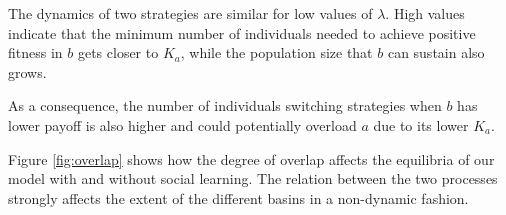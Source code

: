\documentclass[3p,authoryear,twocolumn]{elsarticle} %
\begin{document}



The dynamics of two strategies are similar for low values of $\lambda$. High values indicate that the minimum number of individuals needed to achieve positive fitness in $b$ gets closer to $K_a$, while the population size that $b$ can sustain also grows. 

As a consequence, the number of individuals switching strategies when $b$ has lower payoff is also higher and could potentially overload $a$ due to its lower $K_a$.



Figure \ref{fig:overlap} shows how the degree of overlap affects the equilibria of our model with and without social learning. The relation between the two processes strongly affects the extent of the different basins in a non-dynamic fashion.


\end{document}
